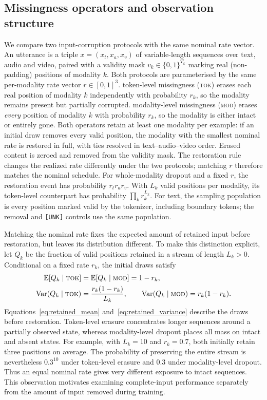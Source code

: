 \documentclass[preprint,11pt]{elsarticle}
\newcommand{\tokenlevel}{token-level}
\newcommand{\modlevel}{modality-level}
\newcommand{\IMM}{\textsc{tok}}          %
\newcommand{\FMM}{\textsc{mod}}          %
\begin{document}
\subsection{Missingness operators and observation structure}

We compare two input-corruption protocols with the same nominal rate vector.
An utterance is a triple
$x=(x_t,x_a,x_v)$ of variable-length sequences over text, audio and video,
paired with a validity mask $v_k\in\{0,1\}^{T_k}$ marking real (non-padding)
positions of modality $k$. Both protocols are parameterised by the same
per-modality rate vector $r\in[0,1]^3$. \tokenlevel{} missingness (\IMM{})
erases each real position of modality $k$ independently with probability
$r_k$, so the modality remains present but partially corrupted. \modlevel{}
missingness (\FMM{}) erases \emph{every} position of modality $k$ with
probability $r_k$, so the modality is either intact or entirely gone. Both
operators retain at least one modality per example: if an initial draw removes
every valid position, the modality with the smallest nominal rate is restored
in full, with ties resolved in text--audio--video order. Erased content is
zeroed and removed from the validity mask. The restoration rule changes the
realized rate differently under the two protocols; matching $r$ therefore
matches the nominal schedule. For whole-modality dropout and a fixed $r$,
the restoration event has probability $r_t r_a r_v$. With $L_k$ valid positions
per modality, its token-level counterpart has probability
$\prod_k r_k^{L_k}$.
For text, the sampling population is every position marked valid by the
tokenizer, including boundary tokens; the removal and \texttt{[UNK]} controls
use the same population.

Matching the nominal rate fixes the expected amount of retained input before
restoration, but leaves its distribution different. To make this distinction
explicit, let $Q_k$ be the fraction of valid positions retained in a stream
of length $L_k>0$. Conditional on a fixed rate $r_k$, the initial draws satisfy
\begin{align}
\mathbb{E}[Q_k\mid\IMM] &= \mathbb{E}[Q_k\mid\FMM]=1-r_k,
\label{eq:retained_mean}\\
\operatorname{Var}(Q_k\mid\IMM) &= \frac{r_k(1-r_k)}{L_k},\qquad
\operatorname{Var}(Q_k\mid\FMM)=r_k(1-r_k).
\label{eq:retained_variance}
\end{align}
Equations~\eqref{eq:retained_mean} and~\eqref{eq:retained_variance} describe
the draws before restoration. Token-level erasure
concentrates longer sequences around a partially observed state, whereas
modality-level dropout places all mass on intact and absent states. For
example, with $L_k=10$ and $r_k=0.7$, both initially retain three positions
on average. The probability of preserving the entire stream is nevertheless
$0.3^{10}$ under token-level erasure and $0.3$ under modality-level dropout.
Thus an equal nominal rate gives very different exposure to intact sequences.
This observation motivates examining complete-input performance separately
from the amount of input removed during training.
\end{document}
